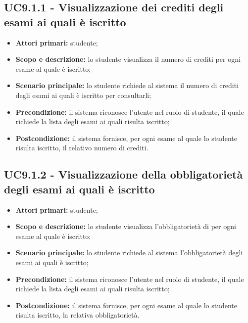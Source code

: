 \documentclass[AnalisiDeiRequisiti.tex]{subfiles}
\begin{document}
\subsection{UC9.1.1 - Visualizzazione dei crediti degli esami ai quali è iscritto}
\begin{itemize}
	\item \textbf{Attori primari:} studente;
	\item \textbf{Scopo e descrizione:} lo studente visualizza il numero di crediti per ogni esame al quale è iscritto;
	\item \textbf{Scenario principale:} lo studente richiede al sistema il numero di crediti degli esami ai quali è iscritto per consultarli;
	\item \textbf{Precondizione:} il sistema riconosce l'utente nel ruolo di studente, il quale richiede la lista degli esami ai quali risulta iscritto; 
	\item \textbf{Postcondizione:} il sistema fornisce, per ogni esame al quale lo studente risulta iscritto, il relativo numero di crediti.
\end{itemize}

\subsection{UC9.1.2 - Visualizzazione della obbligatorietà degli esami ai quali è iscritto}
\begin{itemize}
	\item \textbf{Attori primari:} studente;
	\item \textbf{Scopo e descrizione:} lo studente visualizza l'obbligatorietà di per ogni esame al quale è iscritto;
	\item \textbf{Scenario principale:} lo studente richiede al sistema l'obbligatorietà degli esami ai quali è iscritto;
	\item \textbf{Precondizione:} il sistema riconosce l'utente nel ruolo di studente, il quale richiede la lista degli esami ai quali risulta iscritto; 
	\item \textbf{Postcondizione:} il sistema fornisce, per ogni esame al quale lo studente risulta iscritto, la relativa obbligatorietà.
\end{itemize}
\end{document}
